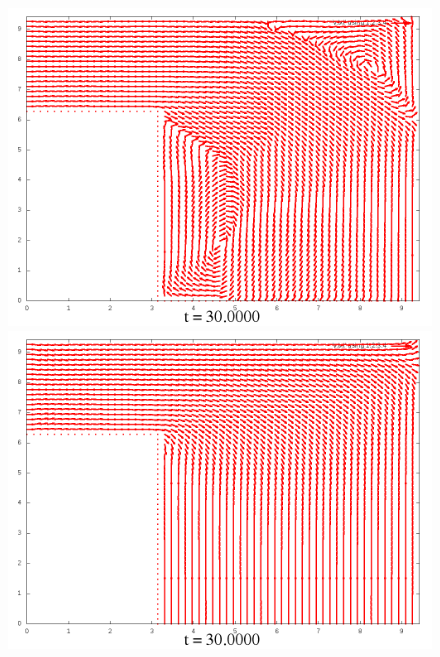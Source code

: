 \documentclass[a4paper, 12pt]{article}
\begin{document}
\begin{figure}[h]
\begin{minipage}[h]{0.4\linewidth}
	\includegraphics[width=1\linewidth]{./img/01_1_1/V/150}
\end{minipage}
\hfill
\begin{minipage}[h]{0.4\linewidth}
	\includegraphics[width=1\linewidth]{./img/01_1_01/V/150}
\end{minipage}
\end{figure}
\end{document}
